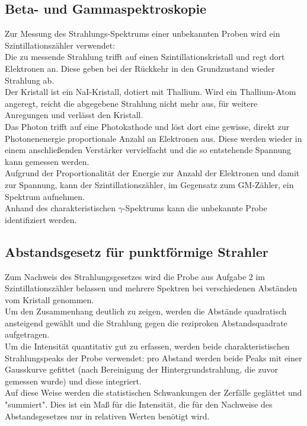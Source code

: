 \documentclass[12pt,a4paper]{article}
\begin{document}
\begin{multicols}{2}
\subsection{Beta- und Gammaspektroskopie}

Zur Messung des Strahlungs-Spektrums einer unbekannten Proben wird ein Szintillationszähler verwendet:\\
Die zu messende Strahlung trifft auf einen Szintillationskristall und regt dort Elektronen an. Diese geben bei der Rückkehr in den Grundzustand wieder Strahlung ab.\\
Der Kristall ist ein NaI-Kristall, dotiert mit Thallium. Wird ein Thallium-Atom angeregt, reicht die abgegebene Strahlung nicht mehr aus, für weitere Anregungen und verlässt den Kristall.\\
Das Photon trifft auf eine Photokathode und löst dort eine gewisse, direkt zur Photonenenergie proportionale Anzahl an Elektronen aus. Diese werden wieder in einem anschließenden Verstärker vervielfacht und die so entstehende Spannung kann gemessen werden.\\
Aufgrund der Proportionalität der Energie zur Anzahl der Elektronen und damit zur Spannung, kann der Szintillationszähler, im Gegensatz zum GM-Zähler, ein Spektrum aufnehmen.\\

\noindent Anhand des charakteristischen $\gamma$-Spektrums kann die unbekannte Probe identifiziert werden.

\subsection{Abstandsgesetz für punktförmige Strahler}

Zum Nachweis des Strahlungsgesetzes wird die Probe aus Aufgabe 2 im Szintillationszähler belassen und mehrere Spektren bei verschiedenen Abständen vom Kristall genommen.\\
Um den Zusammenhang deutlich zu zeigen, werden die Abstände quadratisch ansteigend gewählt und die Strahlung gegen die reziproken Abstandsquadrate aufgetragen.\\
Um die Intensität quantitativ gut zu erfassen, werden beide charakteristischen Strahlungspeaks der Probe verwendet: pro Abstand werden beide Peaks mit einer Gausskurve gefittet (nach Bereinigung der Hintergrundstrahlung, die zuvor gemessen wurde) und diese integriert.\\
Auf diese Weise werden die statistischen Schwankungen der Zerfälle geglättet und "summiert". Dies ist ein Maß für die Intensität, die für den Nachweise des Abstandsgesetzes nur in relativen Werten benötigt wird.


\end{multicols}
\end{document}
